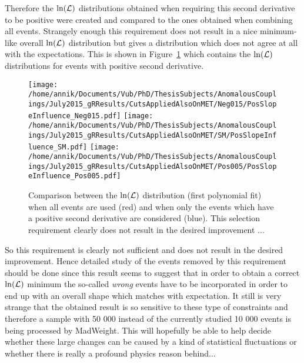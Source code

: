 Therefore the $\ln(\mathcal{L})$ distributions obtained when requiring this second derivative to be positive were created and compared to the ones obtained when combining all events. Strangely enough this requirement does not result in a nice minimum-like overall $\ln(\mathcal{L})$ distribution but gives a distribution which does not agree at all with the expectations. This is shown in Figure~\ref{fig::LogLik_PosSlope} which contains the $\ln(\mathcal{L})$ distributions for events with positive second derivative.
\\

\begin{figure}[h!t]
 \centering
 \texttt{[image: /home/annik/Documents/Vub/PhD/ThesisSubjects/AnomalousCouplings/July2015\_gRResults/CutsAppliedAlsoOnMET/Neg015/PosSlopeInfluence\_Neg015.pdf]}
 \texttt{[image: /home/annik/Documents/Vub/PhD/ThesisSubjects/AnomalousCouplings/July2015\_gRResults/CutsAppliedAlsoOnMET/SM/PosSlopeInfluence\_SM.pdf]}
 \texttt{[image: /home/annik/Documents/Vub/PhD/ThesisSubjects/AnomalousCouplings/July2015\_gRResults/CutsAppliedAlsoOnMET/Pos005/PosSlopeInfluence\_Pos005.pdf]}
 \caption{Comparison between the $\ln(\mathcal{L})$ distribution (first polynomial fit) when all events are used (red) and when only the events which have a positive second derivative are considered (blue). This selection requirement clearly does not result in the desired improvement ...} \label{fig::LogLik_PosSlope}
\end{figure}

So this requirement is clearly not sufficient and does not result in the desired improvement. Hence detailed study of the events removed by this requirement should be done since this result seems to suggest that in order to obtain a correct $\ln(\mathcal{L})$ minimum the so-called \textit{wrong} events have to be incorporated in order to end up with an overall shape which matches with expectation. It still is very strange that the obtained result is so sensitive to these type of constraints and therefore a sample with 50 000 instead of the currently studied 10 000 events is being processed by MadWeight. This will hopefully be able to help decide whether these large changes can be caused by a kind of statistical fluctuations or whether there is really a profound physics reason behind...
\\

